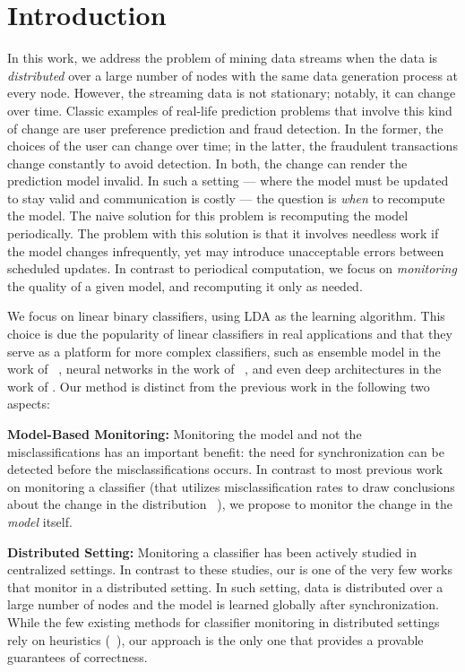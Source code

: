 \documentclass{vldb}
\begin{document}
\section{Introduction}
\label{intro}
In this work, we address the problem of mining data streams when the data is
{\em distributed} over a large number of nodes with the same data generation process at every node. However, the streaming data is not stationary; notably, it can change over time. Classic examples of real-life prediction problems that involve this kind of change are user preference prediction and fraud detection. In the former, the choices of the user can change over time; in the latter, the fraudulent transactions change constantly to avoid detection. In both, the change can render the prediction model invalid.
In such a setting --- where the model must be updated to stay valid and communication is costly --- the question is \textit{when} to recompute the model. The naive solution for this problem is recomputing the model periodically. The problem with this solution is that it involves needless work if the model changes infrequently, yet may introduce unacceptable errors between scheduled updates. 
In contrast to periodical computation, we focus on \textit{monitoring} the quality of a given model, and recomputing it only as needed. 
\par We focus on linear binary classifiers, using LDA \cite{fisher1936use} as the learning algorithm. This choice is due the popularity of linear classifiers in real applications and that they serve as a platform for more complex classifiers, such as ensemble model in the work of ~\cite{Deva, eSVM}, neural networks in the work of ~\cite{osadchy2015k}, and even deep architectures in the work of \cite{ROSS}. Our method is distinct from the previous work in the following two aspects:

\noindent \textbf{Model-Based Monitoring:} 
Monitoring the model and not the misclassifications has an important benefit: the need for synchronization can be detected before the misclassifications occurs. In contrast to most previous work on monitoring a classifier (that utilizes misclassification rates to draw conclusions about the change in the distribution ~\cite{baena2006early,gama2004learning,Nishida2007}), we propose to monitor the change in the {\em model} itself.

\noindent \textbf{Distributed Setting:} Monitoring a classifier has been actively studied in centralized settings. In contrast to these studies, our is one of the very few works that monitor in a distributed setting. In such setting, data is distributed over a large number of nodes and the model is learned globally after synchronization. While the few existing methods for classifier monitoring in distributed settings rely on heuristics (~\citealt{AngGZPH13}), our approach is the only one that provides a provable guarantees of correctness.
\end{document}

